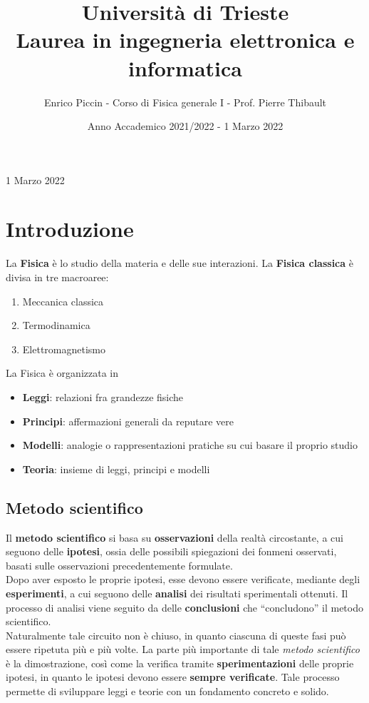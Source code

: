 \documentclass[a4paper]{extarticle}
\title{\textbf{Università di Trieste\\ \vspace{1em}
Laurea in ingegneria elettronica e informatica}}
\author{Enrico Piccin - Corso di Fisica generale I - Prof. Pierre Thibault}
\date{Anno Accademico 2021/2022 - 1 Marzo 2022}
\newcommand{\quotes}[1]{``#1''}
\begin{document}
\vspace{-10mm}
\maketitle

\tableofcontents
\newpage

\noindent
\begin{center}
  1 Marzo 2022
\end{center}

\section{Introduzione}
La \textbf{Fisica} è lo studio della materia e delle sue interazioni. La \textbf{Fisica classica} è divisa in tre macroaree:
\begin{enumerate}
  \item Meccanica classica
  \item Termodinamica
  \item Elettromagnetismo
\end{enumerate}
La Fisica è organizzata in
\begin{itemize}
  \item \textbf{Leggi}: relazioni fra grandezze fisiche
  \item \textbf{Principi}: affermazioni generali da reputare vere
  \item \textbf{Modelli}: analogie o rappresentazioni pratiche su cui basare il proprio studio
  \item \textbf{Teoria}: insieme di leggi, principi e modelli
\end{itemize}

\vspace{1em}
\subsection{Metodo scientifico}
Il \textbf{metodo scientifico} si basa su \textbf{osservazioni} della realtà circostante, a cui seguono delle \textbf{ipotesi}, ossia delle possibili spiegazioni dei fonmeni osservati, basati sulle osservazioni precedentemente formulate.\\
Dopo aver esposto le proprie ipotesi, esse devono essere verificate, mediante degli \textbf{esperimenti}, a cui seguono delle \textbf{analisi} dei risultati sperimentali ottenuti. Il processo di analisi viene seguito da delle \textbf{conclusioni} che \quotes{concludono} il metodo scientifico.\\
Naturalmente tale circuito non è chiuso, in quanto ciascuna di queste fasi può essere ripetuta più e più volte. La parte più importante di tale \emph{metodo scientifico} è la dimostrazione, così come la verifica tramite \textbf{sperimentazioni} delle proprie ipotesi, in quanto le ipotesi devono essere \textbf{sempre verificate}. Tale processo permette di sviluppare leggi e teorie con un fondamento concreto e solido.
\end{document}
